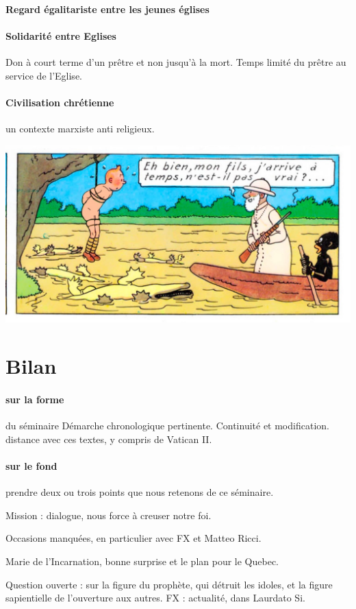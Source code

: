 \paragraph{Regard égalitariste entre les jeunes églises} 

 \paragraph{Solidarité entre Eglises} Don à court terme d'un prêtre et non jusqu'à la mort. Temps limité du prêtre au service de l'Eglise. 

\paragraph{Civilisation chrétienne}


un contexte marxiste anti religieux.

\includegraphics[width=\textwidth]{SeminaireMission/images/TintinCongo3.jpg}
 
\section{Bilan}

\paragraph{sur la forme} du séminaire
Démarche chronologique pertinente. Continuité et modification.
distance avec ces textes, y compris de Vatican II.

\paragraph{sur le fond} prendre deux ou trois points que nous retenons de ce séminaire.

Mission : dialogue, nous force à creuser notre foi.

Occasions manquées, en particulier avec FX et Matteo Ricci.

Marie de l'Incarnation, bonne surprise et le plan pour le Quebec.

Question ouverte : sur la figure du prophète, qui détruit les idoles, et la figure sapientielle de l'ouverture aux autres. FX : actualité, dans Laurdato Si.  




